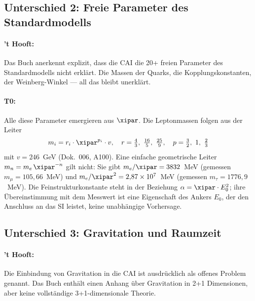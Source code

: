 \subsection{Unterschied 2: Freie Parameter des Standardmodells}

\paragraph{'t Hooft:} Das Buch anerkennt explizit, dass die CAI die 20+ freien
Parameter des Standardmodells nicht erklärt. Die Massen der Quarks, die
Kopplungskonstanten, der Weinberg-Winkel — all das bleibt unerklärt.

\paragraph{T0:} Alle diese Parameter emergieren aus $\xipar$. Die Leptonmassen
folgen aus der Leiter
\begin{equation}
    m_i = r_i \cdot \xipar^{p_i} \cdot v, \quad r = \tfrac{4}{3},\ \tfrac{16}{5},\ \tfrac{25}{9}, \quad p = \tfrac{3}{2},\ 1,\ \tfrac{2}{3}
    \label{eq:mass_spectrum}
\end{equation}
mit $v = 246$~GeV (Dok.~006, A100). Eine einfache geometrische Leiter
$m_n = m_e\,\xipar^{-n}$ gilt nicht: Sie gibt $m_e/\xipar = 3832$~MeV (gemessen
$m_\mu = 105{,}66$~MeV) und $m_e/\xipar^2 = 2{,}87\times10^{7}$~MeV (gemessen
$m_\tau = 1776{,}9$~MeV). Die Feinstrukturkonstante steht in der Beziehung
$\alpha = \xipar \cdot E_0^2$; ihre Übereinstimmung mit dem Messwert ist eine
Eigenschaft des Ankers $E_0$, der den Anschluss an das SI leistet, keine unabhängige
Vorhersage.

\subsection{Unterschied 3: Gravitation und Raumzeit}

\paragraph{'t Hooft:} Die Einbindung von Gravitation in die CAI ist ausdrücklich
als offenes Problem genannt. Das Buch enthält einen Anhang über Gravitation in
2+1 Dimensionen, aber keine vollständige 3+1-dimensionale Theorie.

